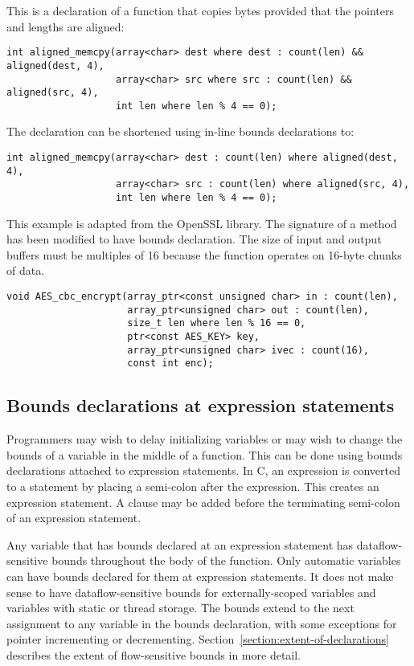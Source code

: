 This is a declaration of a function that copies bytes provided that the
pointers and lengths are aligned:
\begin{verbatim}
int aligned_memcpy(array<char> dest where dest : count(len) && aligned(dest, 4),
                   array<char> src where src : count(len) && aligned(src, 4),
                   int len where len % 4 == 0);
\end{verbatim}

The declaration can be shortened using in-line bounds declarations to:

\begin{verbatim}
int aligned_memcpy(array<char> dest : count(len) where aligned(dest, 4),
                   array<char> src : count(len) where aligned(src, 4),
                   int len where len % 4 == 0);
\end{verbatim}

This example is adapted from the OpenSSL library. The signature of a
method has been modified to have bounds declaration. The size of input
and output buffers must be multiples of 16 because the function operates
on 16-byte chunks of data.

\begin{verbatim}
void AES_cbc_encrypt(array_ptr<const unsigned char> in : count(len),
                     array_ptr<unsigned char> out : count(len),
                     size_t len where len % 16 == 0,
                     ptr<const AES_KEY> key,
                     array_ptr<unsigned char> ivec : count(16),
                     const int enc);
\end{verbatim}

\subsection{Bounds declarations at expression statements}
\label{section:statement-declarations}

Programmers may wish to delay initializing variables or may wish to
change the bounds of a variable in the middle of a function. This can be
done using bounds declarations attached to expression statements. In C,
an expression is converted to a statement by placing a semi-colon after
the expression. This creates an expression statement. A 
clause may be added before the terminating semi-colon of an expression
statement.

Any variable that has bounds declared at an expression statement has
dataflow-sensitive bounds throughout the body of the function. Only
automatic variables can have bounds declared for them at expression
statements. It does not make sense to have dataflow-sensitive bounds for
externally-scoped variables and variables with static or thread storage.
The bounds extend to the next assignment to any variable in the bounds
declaration, with some exceptions for pointer incrementing or
decrementing. Section~\ref{section:extent-of-declarations} 
describes the extent of flow-sensitive bounds
in more detail.

